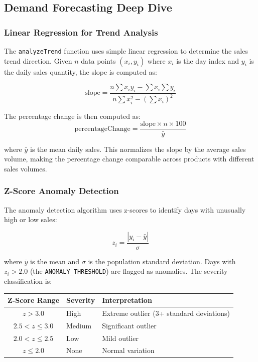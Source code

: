 \documentclass[12pt,onecolumn]{IEEEtran}
\begin{document}
\subsection{Demand Forecasting Deep Dive}

\subsubsection{Linear Regression for Trend Analysis}

The \texttt{analyzeTrend} function uses simple linear regression to determine the sales trend direction. Given $n$ data points $(x_i, y_i)$ where $x_i$ is the day index and $y_i$ is the daily sales quantity, the slope is computed as:

\[
\text{slope} = \frac{n \sum x_i y_i - \sum x_i \sum y_i}{n \sum x_i^2 - (\sum x_i)^2}
\]

The percentage change is then computed as:
\[
\text{percentageChange} = \frac{\text{slope} \times n \times 100}{\bar{y}}
\]

where $\bar{y}$ is the mean daily sales. This normalizes the slope by the average sales volume, making the percentage change comparable across products with different sales volumes.

\subsubsection{Z-Score Anomaly Detection}

The anomaly detection algorithm uses z-scores to identify days with unusually high or low sales:

\[
z_i = \frac{|y_i - \bar{y}|}{\sigma}
\]

where $\bar{y}$ is the mean and $\sigma$ is the population standard deviation. Days with $z_i > 2.0$ (the \texttt{ANOMALY\_THRESHOLD}) are flagged as anomalies. The severity classification is:

\begin{center}
\begin{tabular}{cll}
  \toprule
  \textbf{Z-Score Range} & \textbf{Severity} & \textbf{Interpretation} \\
  \midrule
  $z > 3.0$   & High   & Extreme outlier (3+ standard deviations) \\
  $2.5 < z \leq 3.0$ & Medium & Significant outlier \\
  $2.0 < z \leq 2.5$ & Low    & Mild outlier \\
  $z \leq 2.0$ & None  & Normal variation \\
  \bottomrule
\end{tabular}
\end{center}
\end{document}
